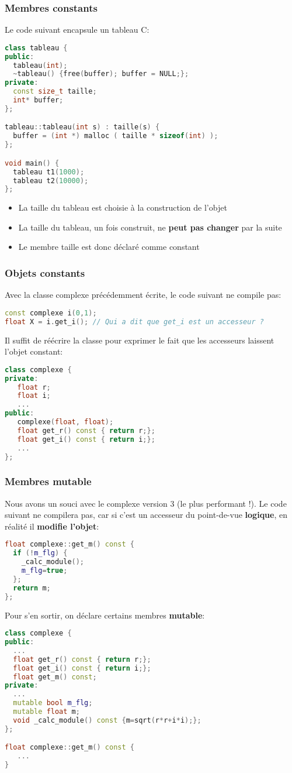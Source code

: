 \documentclass{beamer}
\begin{document}
\begin{frame}[fragile=singleslide,shrink=20]
\frametitle {Membres constants}
Le code suivant encapsule un tableau C:
\begin{lstlisting}[language=c++]
class tableau {
public:
  tableau(int);
  ~tableau() {free(buffer); buffer = NULL;};
private:
  const size_t taille;
  int* buffer;
};

tableau::tableau(int s) : taille(s) {
  buffer = (int *) malloc ( taille * sizeof(int) );
};

void main() {
  tableau t1(1000);
  tableau t2(10000);
};
\end{lstlisting}

\begin{itemize}
\item{La taille du tableau est choisie à la construction de l'objet}
\item{La taille du tableau, un fois construit, ne \textbf{peut pas changer} par la suite}
\item{Le membre taille est donc déclaré comme constant}
\end{itemize}
\end{frame}

\begin{frame}[fragile=singleslide,shrink=20]
\frametitle {Objets constants}
Avec la classe complexe précédemment écrite, le code suivant ne compile pas:
\begin{lstlisting}[language=c++]
const complexe i(0,1);
float X = i.get_i(); // Qui a dit que get_i est un accesseur ?
\end{lstlisting}
Il suffit de réécrire la classe pour exprimer le fait que les accesseurs laissent l'objet constant:
\begin{lstlisting}[language=c++]
class complexe {
private:
   float r;
   float i;
   ...
public:
   complexe(float, float);
   float get_r() const { return r;};
   float get_i() const { return i;};
   ...
};
\end{lstlisting}
\end{frame}

\begin{frame}[fragile=singleslide,shrink=20]
\frametitle {Membres mutable}
Nous avons un souci avec le complexe version 3 (le plus performant !). Le code suivant ne compilera pas,
car si c'est un accesseur du point-de-vue \textbf{logique}, en réalité il \textbf{modifie l'objet}:
\begin{lstlisting}[language=c++]
float complexe::get_m() const {
  if (!m_flg) {
    _calc_module();
    m_flg=true;
  };
  return m;
};
\end{lstlisting}
Pour s'en sortir, on déclare certains membres \textbf{mutable}:
\begin{lstlisting}[language=c++]
class complexe {
public:
  ...
  float get_r() const { return r;};
  float get_i() const { return i;};
  float get_m() const;
private:
  ...
  mutable bool m_flg;
  mutable float m;
  void _calc_module() const {m=sqrt(r*r+i*i);};
};

float complexe::get_m() const {
   ...
}
\end{lstlisting}
\end{frame}
\end{document}
